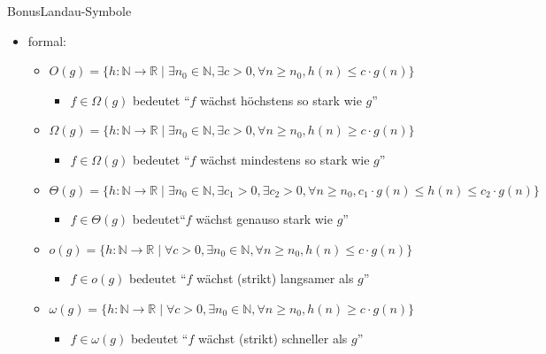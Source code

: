 \begin{frame}[allowframebreaks]{Bonus}{\vspace{0.5cm}Landau-Symbole}
  \begin{itemize}
    \item \alert{formal:} 
    \begin{itemize}
      \item $O(g)= \{h: \mathbb{N}\to\mathbb{R} \;|\; \exists n_0\in\mathbb{N}, \exists c > 0, \forall n\ge n_0, h(n)\le c \cdot g(n)\}$
        \begin{itemize}
          \item $f\in \Omega(g)$ bedeutet \enquote{$f$ wächst \alert{höchstens} so stark wie $g$} 
        \end{itemize}
      \item $\Omega(g)= \{h: \mathbb{N}\to\mathbb{R} \;|\; \exists n_0\in\mathbb{N}, \exists c > 0, \forall n\ge n_0, h(n)\ge c \cdot g(n)\}$
        \begin{itemize}
          \item $f\in \Omega(g)$ bedeutet \enquote{$f$ wächst \alert{mindestens} so stark wie $g$} 
        \end{itemize}
      \item $\Theta(g)= \{h: \mathbb{N}\to\mathbb{R} \;|\; \exists n_0\in\mathbb{N}, \exists c_1 > 0, \exists c_2 > 0, \forall n\ge n_0, c_1 \cdot g(n) \le h(n)\le c_2 \cdot g(n)\}$
        \begin{itemize}
          \item $f\in \Theta(g)$ bedeutet\enquote{$f$ wächst \alert{genauso} stark wie $g$} 
        \end{itemize}
      \item $o(g)= \{h: \mathbb{N}\to\mathbb{R} \;|\; \forall c > 0, \exists n_0\in\mathbb{N}, \forall n\ge n_0, h(n)\le c \cdot g(n)\}$
        \begin{itemize}
          \item $f\in o(g)$ bedeutet \enquote{$f$ wächst \alert{(strikt) langsamer} als $g$} 
        \end{itemize}
      \item $\omega(g)= \{h: \mathbb{N}\to\mathbb{R} \;|\; \forall c > 0, \exists n_0\in\mathbb{N}, \forall n\ge n_0, h(n)\ge c \cdot g(n)\}$
        \begin{itemize}
          \item $f\in \omega(g)$ bedeutet \enquote{$f$ wächst \alert{(strikt) schneller} als $g$} 
        \end{itemize}
    \end{itemize}

\end{itemize}
\end{frame}
